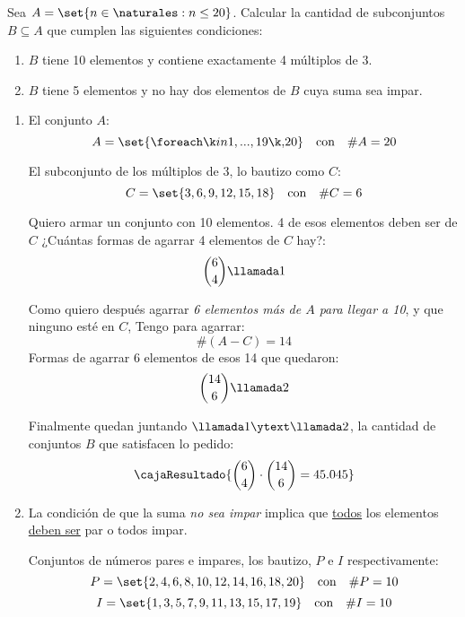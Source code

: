 \def\enumeracion{\roman*)}

\begin{enunciado}{\ejercicio}
  Sea $A = \set{n \in \naturales : n \leq 20}$.
  Calcular la cantidad de subconjuntos $B \subseteq A$ que cumplen
  las siguientes condiciones:
  \begin{enumerate}[label=\enumeracion]
    \item $B$ tiene 10 elementos y contiene exactamente 4 múltiplos de 3.

    \item $B$ tiene 5 elementos y no hay dos elementos de $B$ cuya suma sea impar.
  \end{enumerate}

\end{enunciado}

\begin{enumerate}[label=\enumeracion]
  \item
        El conjunto $A$:
        $$
          A = \set{\foreach \k in {1,...,19}{\k, }20}
          \quad \text{con} \quad
          \#A = 20
        $$

        El subconjunto de los múltiplos de 3, lo bautizo como $C$:
        $$
          C = \set{3, 6, 9, 12, 15, 18}
          \quad \text{con} \quad
          \#C = 6
        $$

        Quiero armar un conjunto con 10 elementos. 4 de esos elementos deben ser de $C$
        ¿Cuántas formas de agarrar 4 elementos de $C$ hay?:
        $$
          \binom{6}{4} \llamada1
        $$

        Como quiero después agarrar \textit{6 elementos más de $A$ para llegar a 10}, y que ninguno esté en $C$,
        Tengo para agarrar:
        $$
          \#(A-C) =  14
        $$
        Formas de agarrar 6 elementos de esos 14 que quedaron:
        $$
          \binom{14}{6} \llamada2
        $$

        Finalmente quedan juntando $\llamada1 \ytext \llamada2$, la cantidad de conjuntos $B$ que satisfacen lo pedido:
        $$
          \cajaResultado{
            \binom{6}{4} \cdot \binom{14}{6} = 45.045
          }
        $$

  \item
        La condición de que la suma \textit{no sea impar} implica que \underline{todos} los elementos
        \underline{deben ser} par o todos impar.

        Conjuntos de números pares e impares, los bautizo, $P$ e $I$ respectivamente:
        $$
          P = \set{2,4,6,8,10,12,14,16,18, 20}
          \quad \text{con} \quad
          \#P = 10
        $$
        $$
          I = \set{1,3,5,7,9,11,13,15,17,19}
          \quad \text{con} \quad
          \#I = 10
        $$


\end{enumerate}
